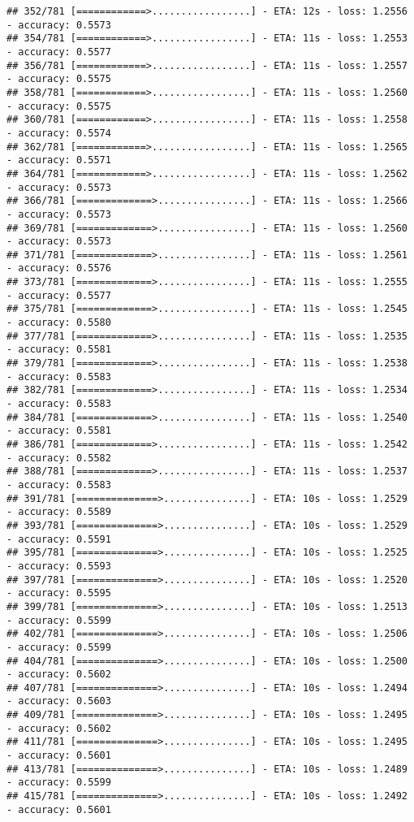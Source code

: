 \documentclass[
]{article}
\begin{document}
\begin{verbatim}
## 352/781 [============>.................] - ETA: 12s - loss: 1.2556 - accuracy: 0.5573
## 354/781 [============>.................] - ETA: 11s - loss: 1.2553 - accuracy: 0.5577
## 356/781 [============>.................] - ETA: 11s - loss: 1.2557 - accuracy: 0.5575
## 358/781 [============>.................] - ETA: 11s - loss: 1.2560 - accuracy: 0.5575
## 360/781 [============>.................] - ETA: 11s - loss: 1.2558 - accuracy: 0.5574
## 362/781 [============>.................] - ETA: 11s - loss: 1.2565 - accuracy: 0.5571
## 364/781 [============>.................] - ETA: 11s - loss: 1.2562 - accuracy: 0.5573
## 366/781 [=============>................] - ETA: 11s - loss: 1.2566 - accuracy: 0.5573
## 369/781 [=============>................] - ETA: 11s - loss: 1.2560 - accuracy: 0.5573
## 371/781 [=============>................] - ETA: 11s - loss: 1.2561 - accuracy: 0.5576
## 373/781 [=============>................] - ETA: 11s - loss: 1.2555 - accuracy: 0.5577
## 375/781 [=============>................] - ETA: 11s - loss: 1.2545 - accuracy: 0.5580
## 377/781 [=============>................] - ETA: 11s - loss: 1.2535 - accuracy: 0.5581
## 379/781 [=============>................] - ETA: 11s - loss: 1.2538 - accuracy: 0.5583
## 382/781 [=============>................] - ETA: 11s - loss: 1.2534 - accuracy: 0.5583
## 384/781 [=============>................] - ETA: 11s - loss: 1.2540 - accuracy: 0.5581
## 386/781 [=============>................] - ETA: 11s - loss: 1.2542 - accuracy: 0.5582
## 388/781 [=============>................] - ETA: 11s - loss: 1.2537 - accuracy: 0.5583
## 391/781 [==============>...............] - ETA: 10s - loss: 1.2529 - accuracy: 0.5589
## 393/781 [==============>...............] - ETA: 10s - loss: 1.2529 - accuracy: 0.5591
## 395/781 [==============>...............] - ETA: 10s - loss: 1.2525 - accuracy: 0.5593
## 397/781 [==============>...............] - ETA: 10s - loss: 1.2520 - accuracy: 0.5595
## 399/781 [==============>...............] - ETA: 10s - loss: 1.2513 - accuracy: 0.5599
## 402/781 [==============>...............] - ETA: 10s - loss: 1.2506 - accuracy: 0.5599
## 404/781 [==============>...............] - ETA: 10s - loss: 1.2500 - accuracy: 0.5602
## 407/781 [==============>...............] - ETA: 10s - loss: 1.2494 - accuracy: 0.5603
## 409/781 [==============>...............] - ETA: 10s - loss: 1.2495 - accuracy: 0.5602
## 411/781 [==============>...............] - ETA: 10s - loss: 1.2495 - accuracy: 0.5601
## 413/781 [==============>...............] - ETA: 10s - loss: 1.2489 - accuracy: 0.5599
## 415/781 [==============>...............] - ETA: 10s - loss: 1.2492 - accuracy: 0.5601

\end{verbatim}
\end{document}
